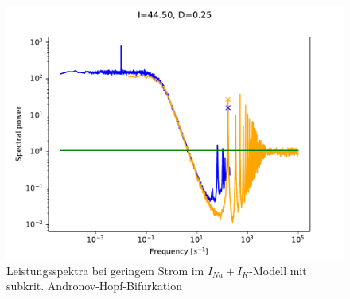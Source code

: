 \documentclass[12pt,a4paper]{article}
\begin{document}
\begin{figure}[H]
	\centering
	\includegraphics[scale=1]{twofoud25i4450ws.pdf}\caption{Leistungsspektra bei geringem Strom im $I_{Na}+I_K$-Modell mit subkrit. Andronov-Hopf-Bifurkation}
	\label{twofoud25small}
\end{figure}
\end{document}
